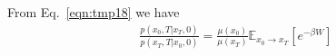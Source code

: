 \documentclass[aps, pre, preprint,unsortedaddress,a4paper,onecolumn]{revtex4}
\newcommand{\mc}[0]{\mathcal {C}}
\begin{document}
From Eq.~\eqref{eqn:tmp18} we have
\begin{align}
  \label{eq:tmp22}
  \frac{p(x_0,T\vert x_T,0)}{  p(x_T,T\vert x_0,0)  }
  =
  \frac{\mu(x_0)}{\mu(x_T)}
  \mathbb E_{x_0\rightarrow x_T} [e^{-\beta W}]
\end{align}


{}

\end{document}
